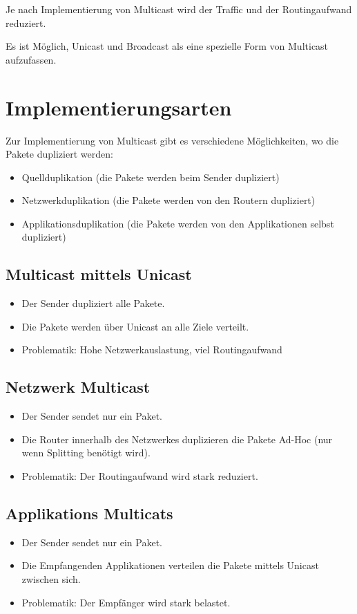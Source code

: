 	Je nach Implementierung von Multicast wird der Traffic und der Routingaufwand reduziert.

	Es ist Möglich, Unicast und Broadcast als eine spezielle Form von Multicast aufzufassen.

	\section{Implementierungsarten}
		Zur Implementierung von Multicast gibt es verschiedene Möglichkeiten, wo die Pakete dupliziert werden:
		\begin{itemize}
			\item Quellduplikation (die Pakete werden beim Sender dupliziert)
			\item Netzwerkduplikation (die Pakete werden von den Routern dupliziert)
			\item Applikationsduplikation (die Pakete werden von den Applikationen selbst dupliziert)
		\end{itemize}

		\subsection{Multicast mittels Unicast}
			\begin{itemize}
				\item Der Sender dupliziert alle Pakete.
				\item Die Pakete werden über Unicast an alle Ziele verteilt.
				\item Problematik: Hohe Netzwerkauslastung, viel Routingaufwand
			\end{itemize}

		\subsection{Netzwerk Multicast}
			\begin{itemize}
				\item Der Sender sendet nur ein Paket.
				\item Die Router innerhalb des Netzwerkes duplizieren die Pakete Ad-Hoc (nur wenn Splitting benötigt wird).
				\item Problematik: Der Routingaufwand wird stark reduziert.
			\end{itemize}

		\subsection{Applikations Multicats}
			\begin{itemize}
				\item Der Sender sendet nur ein Paket.
				\item Die Empfangenden Applikationen verteilen die Pakete mittels Unicast zwischen sich.
				\item Problematik: Der Empfänger wird stark belastet.
			\end{itemize}

